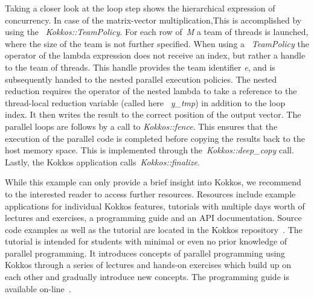 Taking a closer look at the loop step shows the hierarchical expression of concurrency. In case of the matrix-vector multiplication,This is accomplished by using the ~\emph{Kokkos::TeamPolicy}. For each row of~\emph{M} a team of threads is launched, where the size of the team is not further specified. When using a ~\emph{TeamPolicy} the operator of the lambda expression does not receive an index, but rather a handle to the team of threads. 
This handle provides the team identifier \emph{e}, and is subsequently handed to the nested parallel execution policies. The nested reduction requires the operator of the nested lambda to take a reference to the thread-local reduction variable (called here ~\emph{y\_tmp}) in addition to the loop index. It then writes the result to the correct position of the output vector. 
The parallel loops are follows by a call to \emph{Kokkos::fence}. This ensures that the execution of the parallel code is completed before copying the results back to the host memory space. This is implemented through the~\emph{Kokkos::deep_copy} call. Lastly, the Kokkos application calls~\emph{Kokkos::finalize}.

While this example can only provide a brief insight into Kokkos, we recommend to the interested reader to access further resources. Resources include example applications for individual Kokkos features, tutorials with multiple days worth of lectures and exercises, a programming guide and an API documentation. Source code examples as well as the tutorial are located in the Kokkos repository~\cite{KOKKOS_REPO}. The tutorial is intended for students with minimal or even no prior knowledge of parallel programming. It introduces concepts of parallel programming using Kokkos through a series of lectures and hands-on exercises which build up on each other and gradually introduce new concepts. The programming guide is available on-line~\cite{KOKKOS_WIKI}. 

